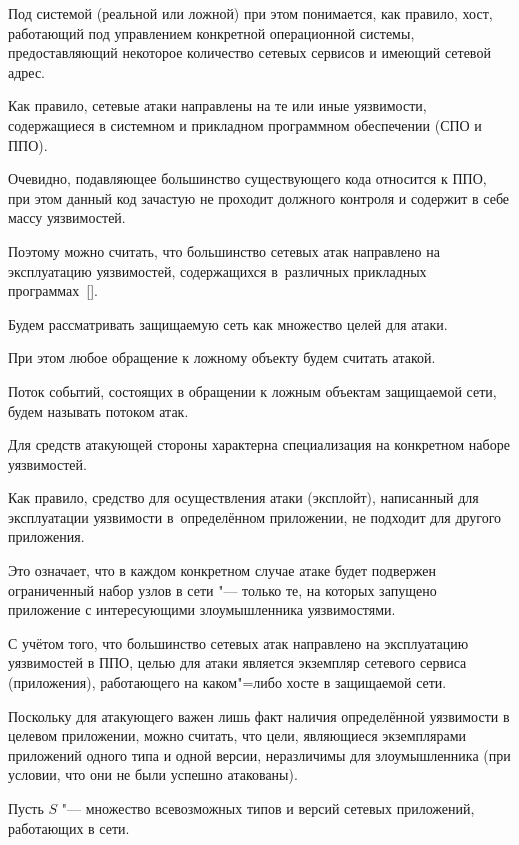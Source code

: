Под системой (реальной или ложной) при этом понимается, как правило, хост, работающий под управлением конкретной операционной системы, предоставляющий некоторое количество сетевых сервисов и имеющий сетевой адрес.





Как правило, сетевые атаки направлены на те или иные уязвимости, содержащиеся в системном и прикладном программном обеспечении (СПО и ППО).  

Очевидно, подавляющее большинство существующего кода относится к ППО, при этом данный код зачастую не проходит должного контроля и содержит в себе массу уязвимостей. 

Поэтому можно считать, что большинство сетевых атак направлено на эксплуатацию уязвимостей, содержащихся в~различных прикладных программах~[]. 



Будем рассматривать защищаемую сеть как множество целей для атаки. 

При этом любое обращение к ложному объекту будем считать атакой. 

Поток событий, состоящих в обращении к ложным объектам защищаемой сети, будем называть потоком атак. 

Для средств атакующей стороны характерна специализация на конкретном наборе уязвимостей. 

Как правило, средство для осуществления атаки (эксплойт), написанный для эксплуатации уязвимости в~определённом приложении, не подходит для другого приложения. 

Это означает, что в каждом конкретном случае атаке будет подвержен ограниченный набор узлов в сети "--- только те, на которых запущено приложение с интересующими злоумышленника уязвимостями. 

С учётом того, что большинство сетевых атак направлено на эксплуатацию уязвимостей в ППО, целью для атаки является экземпляр сетевого сервиса (приложения), работающего на каком"=либо хосте в защищаемой сети. 

Поскольку для атакующего важен лишь факт наличия определённой уязвимости в целевом приложении, можно считать, что цели, являющиеся экземплярами приложений одного типа и одной версии, неразличимы для злоумышленника (при условии, что они не были успешно атакованы).



Пусть $S$ "--- множество всевозможных типов и версий сетевых приложений, работающих в сети. 

